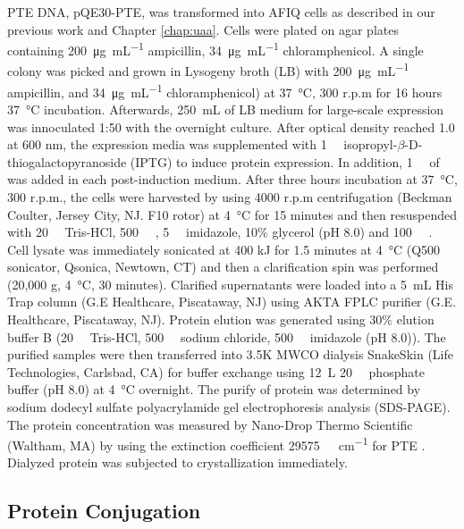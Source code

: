\begin{refsection}
PTE DNA, pQE30-PTE, was transformed into AFIQ cells as described in our previous
work\cite{Yang2014a} and Chapter \ref{chap:uaa}. Cells were plated on agar
plates containing \SI{200}{\ug\per\mL} ampicillin, \SI{34}{\ug\per\mL}
chloramphenicol. A single colony was picked and grown in Lysogeny broth (LB)
with \SI{200}{\ug\per\mL} ampicillin, and \SI{34}{\ug\per\mL} chloramphenicol)
at \SI{37}{\celsius}, 300 r.p.m for 16 hours \SI{37}{\celsius} incubation.
Afterwards, \SI{250}{\mL} of LB medium for large-scale expression was
innoculated 1:50 with the overnight culture.  After optical density reached 1.0
at 600 nm, the expression media was supplemented with \SI{1}{\milli\Molar}
isopropyl-$\beta$-D-thiogalactopyranoside (IPTG) to induce protein expression.
In addition, \SI{1}{\milli\Molar} of  was added in each
post-induction medium.  After three hours incubation at \SI{37}{\celsius}, 300
r.p.m., the cells were harvested by using 4000 r.p.m centrifugation (Beckman
Coulter, Jersey City, NJ.  F10 rotor) at \SI{4}{\celsius} for 15 minutes and
then resuspended with \SI{20}{\milli\Molar} Tris-HCl, \SI{500}{\milli\Molar}
, \SI{5}{\milli\Molar} imidazole, 10\% glycerol (pH 8.0) and
\SI{100}{\micro\Molar} . Cell lysate was immediately sonicated at 400 kJ
for 1.5 minutes at \SI{4}{\celsius} (Q500 sonicator, Qsonica, Newtown, CT) and then a
clarification spin was performed (20,000 g, \SI{4}{\celsius}, 30 minutes).
Clarified supernatants were loaded into a \SI{5}{\mL} His Trap column (G.E
Healthcare, Piscataway, NJ) using AKTA FPLC purifier (G.E.  Healthcare,
Piscataway, NJ).  Protein elution was generated using 30\% elution buffer B
(\SI{20}{\milli\Molar} Tris-HCl, \SI{500}{\milli\Molar} sodium chloride,
\SI{500}{\milli\Molar} imidazole (pH 8.0)). The purified samples were then
transferred into 3.5K MWCO dialysis SnakeSkin (Life Technologies, Carlsbad, CA)
for buffer exchange using \SI{12}{\L} \SI{20}{\milli\Molar} phosphate buffer
(pH 8.0) at \SI{4}{\celsius} overnight. The purify of protein was
determined by sodium dodecyl sulfate polyacrylamide gel electrophoresis analysis
(SDS-PAGE). The protein concentration was measured by Nano-Drop Thermo
Scientific (Waltham, MA) by using the extinction coefficient
\SI{29575}{\per\Molar\per\cm} for PTE \cite{Gasteiger2005, Pace1995}. Dialyzed
protein was subjected to crystallization immediately.

\subsection{Protein Conjugation}


\end{refsection}
